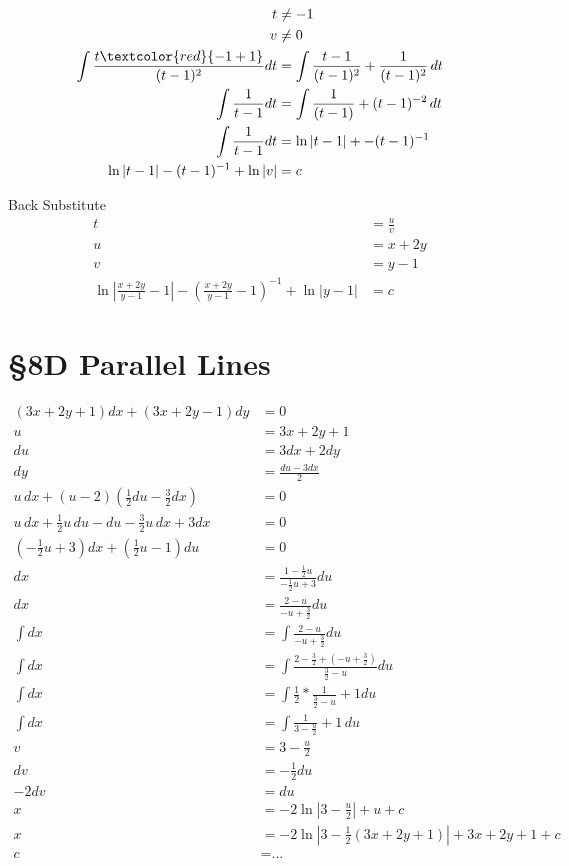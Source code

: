 \begin{ex}
\begin{step}
\begin{align*}
    t&\neq -1\\
    v&\neq 0\\
    \int \frac{t \textcolor{red}{-1+1}}{(t-1)^2}dt&= \int \frac{t-1}{(t-1)^2}+\frac{1}{(t-1)^2}\,dt\\
    \int \frac{1}{t-1}dt&= \int \frac{1}{(t-1)}+(t-1)^{-2}\,dt\\
    \int \frac{1}{t-1}dt&=\ln|t-1|+-(t-1)^{-1}\\
    \ln |t-1|-(t-1)^{-1} + \ln|v|&=c
    \end{align*}
\end{step}
\begin{step} Back Substitute
    \begin{align*}
    t&=\frac{u}{v}\\
    u&= x+2y\\
    v&= y-1\\
    \ln \left| \frac{x+2y}{y-1} -1 \right| - \left(\frac{x+2y}{y-1} -1 \right) ^{-1} +\ln |y-1|&=c
\end{align*}
\end{step}
\end{ex}
\section*{\S 8D Parallel Lines}
\begin{ex}
\begin{align*}
    (3x+2y+1)dx+(3x+2y-1)dy&= 0\\
    u&= 3x+2y+1\\
    du&= 3dx+2dy\\
    dy&= \frac{du-3dx}{2}\\
    u\,dx+(u-2) \left(\frac{1}{2}du-\frac{3}{2}dx \right) &=0\\
    u\,dx + \frac{1}{2}u\,du - du-\frac{3}{2}u\,dx+3dx&=0\\
    \left( -\frac{1}{2}u +3 \right) dx + \left(\frac{1}{2}u-1 \right)du&= 0\\
    dx&= \frac{1-\frac{1}{2}u}{-\frac{1}{2}u+3}du\\
    dx&=\frac{2-u}{-u+\frac{3}{2}}du\\
    \int dx&= \int \frac{2-u}{-u+\frac{3}{2}}du\\
    \int dx&= \int \frac{2-\frac{3}{2}+\left( -u+\frac{3}{2}\right)}{\frac{3}{2}-u}du\\
    \int dx&=\int \frac{1}{2}* \frac{1}{\frac{3}{2}-u}+1 du\\
    \int dx&= \int \frac{1}{3-\frac{u}{2}}+1\,du\\
    v&= 3-\frac{u}{2}\\
    dv&=-\frac{1}{2}du\\
    -2dv&=du\\
    x&= -2\ln \left| 3-\frac{u}{2}\right| +u +c\\
    x&= -2\ln\left| 3-\frac{1}{2}(3x+2y+1) \right| +3x+2y+1+c\\
    c&= \text{...}
\end{align*}
\end{ex}